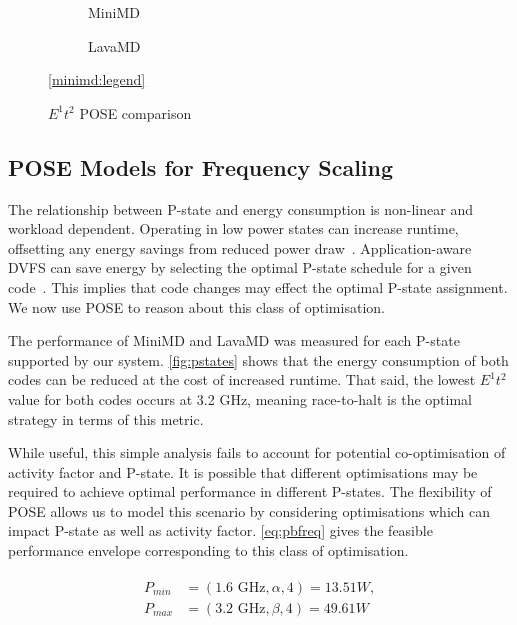 \begin{figure}[t]%
  \providecommand{\plotwidth}{.95\linewidth}
  \begin{subfigure}[t]{.5\linewidth}%
    \caption{MiniMD}%
    \label{fig:minimd_pose}
  \end{subfigure}%
  \begin{subfigure}[t]{.5\linewidth}%
    \caption{LavaMD}%
    \label{fig:lavamd_pose}
  \end{subfigure}%
  \begin{center}%
    \ref{minimd:legend}%
  \end{center}%
  \caption{$E^1t^2$ POSE comparison}%
  \label{fig:comparison}%
\end{figure}


\subsection{POSE Models for Frequency Scaling}
The relationship between P-state and energy consumption is non-linear and workload dependent.
Operating in low power states can increase runtime, offsetting any energy savings from reduced power draw~\cite{le:2010aa}.
Application-aware DVFS can save energy by selecting the optimal P-state schedule for a given code~\cite{choi:2004aa}.
This implies that code changes may effect the optimal P-state assignment. 
We now use POSE to reason about this class of optimisation.

The performance of MiniMD and LavaMD was measured for each P-state supported by our system.
\autoref{fig:pstates} shows that the energy consumption of both codes can be reduced at the cost of increased runtime.
That said, the lowest $E^1t^2$ value for both codes occurs at 3.2 GHz, meaning race-to-halt is the optimal strategy in terms of this metric. 

While useful, this simple analysis fails to account for potential co-opti\-misa\-tion of activity factor and P-state.
It is possible that different optimisations may be required to achieve optimal performance in different P-states.
The flexibility of POSE allows us to model this scenario by considering optimisations which can impact P-state as well as activity factor.
\autoref{eq:pbfreq} gives the feasible performance envelope corresponding to this class of optimisation.

\begin{align}
  \label{eq:pbfreq}
  \begin{split}
    P_{min} &= (1.6\text{ GHz}, \alpha, 4) = 13.51W, \\
    P_{max} &= (3.2\text{ GHz}, \beta, 4) = 49.61W
  \end{split}
\end{align}



